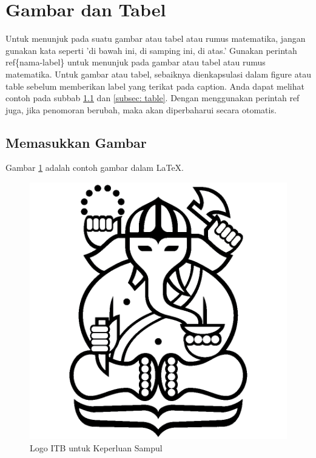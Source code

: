 \section{Gambar dan Tabel}
Untuk menunjuk pada suatu gambar atau tabel atau rumus matematika, jangan gunakan kata seperti 'di bawah ini, di samping ini, di atas.' Gunakan perintah ref\{nama-label\} untuk menunjuk pada gambar atau tabel atau rumus matematika. Untuk gambar atau tabel, sebaiknya dienkapsulasi dalam figure atau table sebelum memberikan label yang terikat pada caption. Anda dapat melihat contoh pada subbab \ref{subsec: image} dan \ref{subsec: table}. Dengan menggunakan perintah ref juga, jika penomoran berubah, maka akan diperbaharui secara otomatis.

\subsection{Memasukkan Gambar}\label{subsec: image}
Gambar \ref{fig:ganesha-sampul} adalah contoh gambar dalam \LaTeX.
\begin{figure}
    \centering
    \includegraphics[scale=0.05]{img/logo_itb_sampul.png}
    \caption{Logo ITB untuk Keperluan Sampul}
    \label{fig:ganesha-sampul}
\end{figure}

